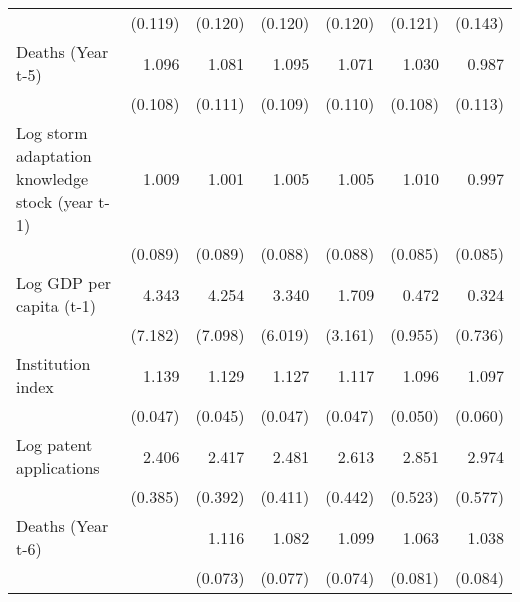 \begin{table}[htbp]
\begin{tabular}{l*{6}{D{.}{.}{-1}}}
                    &     (0.119)         &     (0.120)         &     (0.120)         &     (0.120)         &     (0.121)         &     (0.143)         \\
\addlinespace
Deaths (Year t-5)   &       1.096         &       1.081         &       1.095         &       1.071         &       1.030         &       0.987         \\
                    &     (0.108)         &     (0.111)         &     (0.109)         &     (0.110)         &     (0.108)         &     (0.113)         \\
\addlinespace
Log storm adaptation knowledge stock (year t-1)&       1.009         &       1.001         &       1.005         &       1.005         &       1.010         &       0.997         \\
                    &     (0.089)         &     (0.089)         &     (0.088)         &     (0.088)         &     (0.085)         &     (0.085)         \\
\addlinespace
Log GDP per capita (t-1)&       4.343         &       4.254         &       3.340         &       1.709         &       0.472         &       0.324         \\
                    &     (7.182)         &     (7.098)         &     (6.019)         &     (3.161)         &     (0.955)         &     (0.736)         \\
\addlinespace
Institution index   &       1.139\sym{***}&       1.129\sym{***}&       1.127\sym{***}&       1.117\sym{***}&       1.096\sym{**} &       1.097\sym{*}  \\
                    &     (0.047)         &     (0.045)         &     (0.047)         &     (0.047)         &     (0.050)         &     (0.060)         \\
\addlinespace
Log patent applications&       2.406\sym{***}&       2.417\sym{***}&       2.481\sym{***}&       2.613\sym{***}&       2.851\sym{***}&       2.974\sym{***}\\
                    &     (0.385)         &     (0.392)         &     (0.411)         &     (0.442)         &     (0.523)         &     (0.577)         \\
\addlinespace
Deaths (Year t-6)   &                     &       1.116\sym{*}  &       1.082         &       1.099         &       1.063         &       1.038         \\
                    &                     &     (0.073)         &     (0.077)         &     (0.074)         &     (0.081)         &     (0.084)         \\

\end{tabular}
\end{table}
